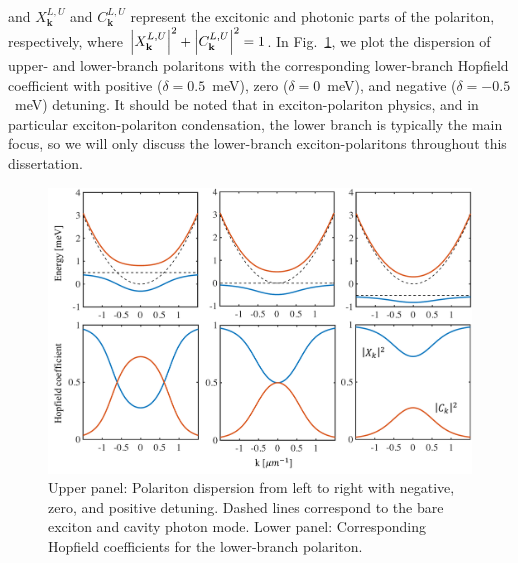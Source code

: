 and $X_\mathbf{k}^{L,U}$ and $C_\mathbf{k}^{L,U}$ represent the excitonic and photonic parts of the polariton, respectively, where $\abs{X_\mathbf{k}^{L,U}}^2 + \abs{C_\mathbf{k}^{L,U}}^2=1$.
In Fig.~\ref{fig:Ch1_disp}, we plot the dispersion of upper- and lower-branch polaritons with the corresponding lower-branch Hopfield coefficient with positive ($\delta=0.5$~meV), zero ($\delta = 0$~meV), and negative ($\delta=-0.5$~meV) detuning.
It should be noted that in exciton-polariton physics, and in particular exciton-polariton condensation, the lower branch is typically the main focus, so we will only discuss the lower-branch exciton-polaritons throughout this dissertation.
%
%
%
\begin{figure}[ht]
    \centering
    \includegraphics[width=0.65\linewidth]{Fig/Ch1/hp_disp.pdf}
    \caption[Polariton dispersion with different detuning]{Upper panel: Polariton dispersion from left to right with negative, zero, and positive detuning. Dashed lines correspond to the bare exciton and cavity photon mode. Lower panel: Corresponding Hopfield coefficients for the lower-branch polariton.}
    \label{fig:Ch1_disp}
\end{figure}
%
%
%

